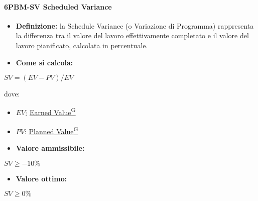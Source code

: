 \paragraph*{6PBM-SV Scheduled Variance}
\begin{itemize}
    \item \textbf{Definizione:} la Schedule Variance (o Variazione di Programma) rappresenta la differenza tra il valore del lavoro effettivamente completato e il valore del lavoro pianificato, calcolata in percentuale.
    \item \textbf{Come si calcola:}
\end{itemize}
\begin{center}
   $SV = (EV-PV)/EV$ 
\end{center}
dove:
\begin{itemize}[label=$\rightarrow$]
    \item $EV$: \href{https://code7crusaders.github.io/docs/RTB/documentazione_interna/glossario.html#earned-value}{Earned Value\textsuperscript{G}}
    \item $PV$: \href{https://code7crusaders.github.io/docs/RTB/documentazione_interna/glossario.html#planned-value}{Planned Value\textsuperscript{G}}
\end{itemize}
\begin{itemize}
    \item \textbf{Valore ammissibile:}
\end{itemize}
\begin{center}
    $SV \geq -10\%$
\end{center}
\begin{itemize}
    \item \textbf{Valore ottimo:}
\end{itemize}
\begin{center}
    $SV \geq 0\%$
\end{center}

